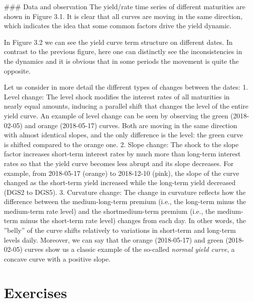 \begin{enumerate}
### Data and observation
The yield/rate time series of different maturities are shown in Figure 3.1. It is clear that all curves are moving in the same direction, which indicates the idea that some common factors drive the yield dynamic.

In Figure 3.2 we can see the yield curve term structure on different dates. In contrast to the previous figure, here one can distinctly see the inconsistencies in the dynamics and it is obvious that in some periods the movement is quite the opposite.


Let us consider in more detail the different types of changes between the dates:
1. Level change: The level shock modifies the interest rates of all maturities in nearly equal amounts, inducing a parallel shift that changes the level of the entire yield curve. An example of level change can be seen by observing the green (2018-02-05) and orange (2018-05-17) curves. Both are moving in the same direction with almost identical slopes, and the only difference is the level: the green curve is shifted compared to the orange one.
2. Slope change: The shock to the slope factor increases short-term interest rates by much more than long-term interest rates so that the yield curve becomes less abrupt and its slope decreases.
For example, from 2018-05-17 (orange) to 2018-12-10 (pink), the slope of the curve changed as the short-term yield increased while the long-term yield decreased (DGS2 to DGS5).
3. Curvature change: The change in curvature reflects how the difference between the medium-long-term premium (i.e., the long-term minus the medium-term rate level) and the shortmedium-term premium (i.e., the medium-term minus the short-term rate level) changes from each day. In other words, the ”belly” of the curve shifts relatively to variations in short-term and long-term levels daily. Moreover, we can say that the orange (2018-05-17) and green (2018-02-05) curves show us a classic example of the so-called \emph{normal yield curve}, a concave curve with a positive slope.







\section*{Exercises}



\end{enumerate}
